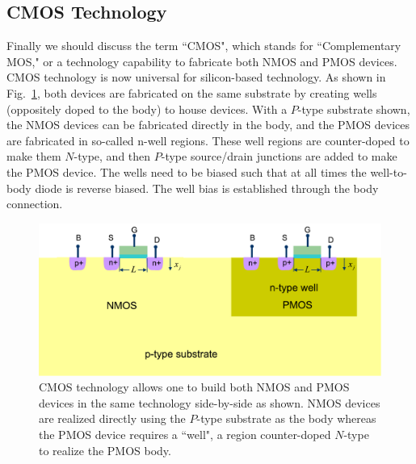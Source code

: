 \subsection{CMOS Technology}
Finally we should discuss the term ``CMOS", which stands for ``Complementary MOS," or a technology capability to fabricate both NMOS and PMOS devices.  CMOS technology is now universal for silicon-based technology.  As shown in Fig.~\ref{fig:cmos_xsect}, both devices are fabricated on the same substrate by creating wells (oppositely doped to the body) to house devices.  With a $P$-type substrate shown, the NMOS devices can be fabricated directly in the body, and the PMOS devices are fabricated in so-called n-well regions.  These well regions are counter-doped to make them $N$-type, and then $P$-type source/drain junctions are added to make the PMOS device.  The wells need to be biased such that at all times the well-to-body diode is reverse biased.  The well bias is established through the body connection.
\begin{figure}[tb]
\centering
\includegraphics[width=.85\columnwidth]{cmos_xsect}
\caption{CMOS technology allows one to build both NMOS and PMOS devices in the same technology side-by-side as shown.  NMOS devices are realized directly using the $P$-type substrate as the body whereas the PMOS device requires a ``well", a region counter-doped $N$-type to realize the PMOS body.}
\label{fig:cmos_xsect}
\end{figure}
